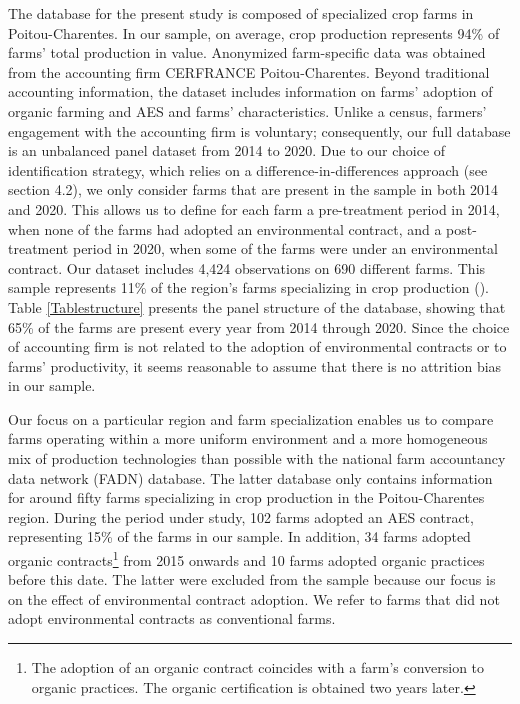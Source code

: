 \begin{Article}
\begin{refsection}[Lassalas]
The database for the present study is composed of specialized crop farms
in Poitou-Charentes. In our sample, on average, crop production
represents 94\% of farms' total production in value. Anonymized
farm-specific data was obtained from the accounting firm CERFRANCE
Poitou-Charentes. Beyond traditional accounting information, the dataset
includes information on farms' adoption of organic farming and AES and
farms' characteristics. Unlike a census, farmers' engagement with the
accounting firm is voluntary; consequently, our full database is an unbalanced panel dataset from 2014 to 2020. Due to our choice of
identification strategy, which relies on a difference-in-differences
approach (see section 4.2), we only consider farms that are present in the sample
in both 2014 and 2020. This allows us to define for each farm a
pre-treatment period in 2014, when none of the farms had adopted an
environmental contract, and a post-treatment period in 2020, when some
of the farms were under an environmental contract. Our dataset includes
4,424 observations on 690 different farms. This sample represents 11\%
of the region's farms specializing in crop production
(\textcite{recensement_agricole_2020}). Table \ref{Tablestructure} presents the panel structure
of the database, showing that 65\% of the farms are present every year
from 2014 through 2020. Since the choice of accounting firm is not
related to the adoption of environmental contracts or to farms'
productivity, it seems reasonable to assume that there is no attrition
bias in our sample.



\newpage

Our focus on a particular region and farm specialization enables us to
compare farms operating within a more uniform environment and a more
homogeneous mix of production technologies than possible with the
national farm accountancy data network (FADN) database. The latter
database only contains information for around fifty farms specializing
in crop production in the Poitou-Charentes region. During the period
under study, 102 farms adopted an AES contract, representing 15\% of the farms in our sample. In addition, 34 farms adopted organic
contracts\footnote{The adoption of an organic contract coincides with a farm's conversion to organic practices. The organic certification is obtained two years later.} from 2015 onwards and 10 farms adopted
organic practices before this date. The latter were excluded from the
sample because our focus is on the effect of environmental contract
adoption. We refer to farms that did not adopt environmental contracts as conventional farms.



\end{refsection}
\end{Article}
